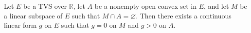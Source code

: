 Let $E$ be a TVS over $\mathbb{R}$, let $A$ be a nonempty open convex set in $E$, and let $M$ be a linear subspace of $E$ such that $M \cap A = \varnothing$. Then there exists a continuous linear form $g$ on $E$ such that $g = 0$ on $M$ and $g > 0$ on $A$.